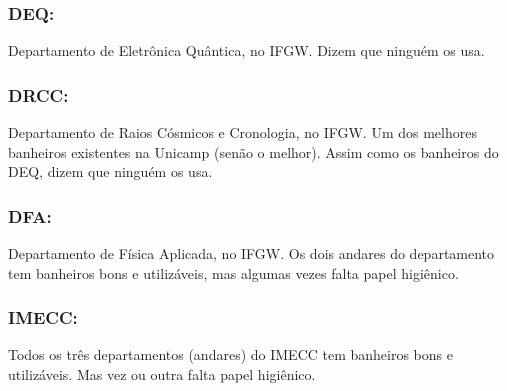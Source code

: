 \subsubsection{DEQ:} Departamento de Eletrônica Quântica, no IFGW. Dizem que
ninguém os usa.

\subsubsection{DRCC:} Departamento de Raios Cósmicos e Cronologia, no IFGW. Um
dos melhores banheiros existentes na Unicamp (senão o melhor). Assim como os
banheiros do DEQ, dizem que ninguém os usa.

\subsubsection{DFA:} Departamento de Física Aplicada, no IFGW. Os dois andares
do departamento tem banheiros bons e utilizáveis, mas algumas vezes falta
papel higiênico.

\subsubsection{IMECC:} Todos os três departamentos (andares) do IMECC tem
banheiros bons e utilizáveis. Mas vez ou outra falta papel higiênico.
